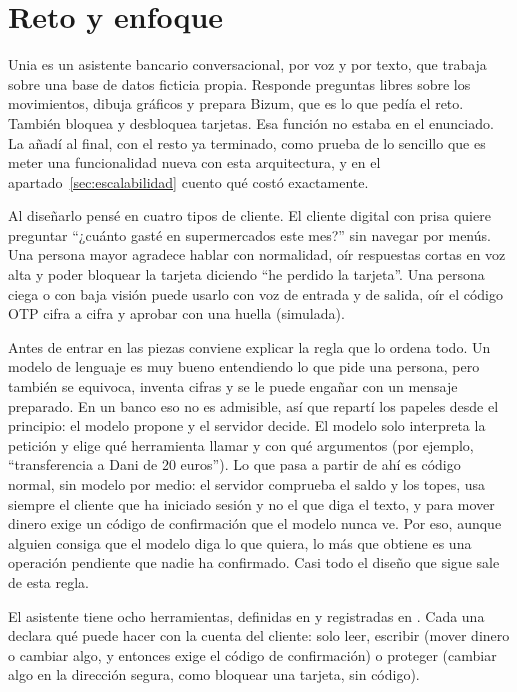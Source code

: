 \section{Reto y enfoque}\label{sec:reto}

Unia es un asistente bancario conversacional, por voz y por texto, que trabaja sobre una base de datos ficticia
propia. Responde preguntas libres sobre los movimientos, dibuja gráficos y prepara Bizum, que es lo que pedía el reto.
También bloquea y desbloquea tarjetas. Esa función no estaba en el enunciado. La añadí al final, con el resto ya
terminado, como prueba de lo sencillo que es meter una funcionalidad nueva con esta arquitectura, y en el apartado~\ref{sec:escalabilidad}
cuento qué costó exactamente.

Al diseñarlo pensé en cuatro tipos de cliente. El cliente digital con prisa quiere preguntar ``¿cuánto gasté en
supermercados este mes?'' sin navegar por menús. Una persona mayor agradece hablar con normalidad, oír respuestas cortas
en voz alta y poder bloquear la tarjeta diciendo ``he perdido la tarjeta''. Una persona ciega o con baja visión
puede usarlo con voz de entrada y de salida, oír el código OTP cifra a cifra y aprobar con una huella (simulada).

Antes de entrar en las piezas conviene explicar la regla que lo ordena todo. Un modelo de lenguaje es muy bueno
entendiendo lo que pide una persona, pero también se equivoca, inventa cifras y se le puede engañar con un mensaje
preparado. En un banco eso no es admisible, así que repartí los papeles desde el principio: el modelo propone y el
servidor decide. El modelo solo interpreta la petición y elige qué herramienta llamar y con qué argumentos (por ejemplo,
``transferencia a Dani de 20 euros''). Lo que pasa a partir de ahí es código normal, sin modelo por medio: el servidor
comprueba el saldo y los topes, usa siempre el cliente que ha iniciado sesión y no el que diga el texto, y para mover
dinero exige un código de confirmación que el modelo nunca ve. Por eso, aunque alguien consiga que el modelo diga lo
que quiera, lo más que obtiene es una operación pendiente que nadie ha confirmado. Casi todo el diseño que sigue sale
de esta regla.

El asistente tiene ocho herramientas, definidas en  y registradas en
. Cada una declara qué puede hacer con la cuenta del cliente: solo leer, escribir (mover
dinero o cambiar algo, y entonces exige el código de confirmación) o proteger (cambiar algo en la dirección segura, como
bloquear una tarjeta, sin código).

